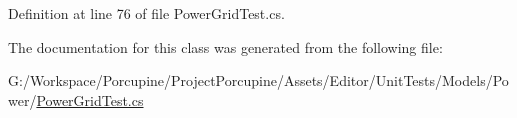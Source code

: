 Definition at line 76 of file Power\+Grid\+Test.\+cs.



The documentation for this class was generated from the following file\+:\begin{DoxyCompactItemize}
\item 
G\+:/\+Workspace/\+Porcupine/\+Project\+Porcupine/\+Assets/\+Editor/\+Unit\+Tests/\+Models/\+Power/\hyperlink{_power_grid_test_8cs}{Power\+Grid\+Test.\+cs}\end{DoxyCompactItemize}
